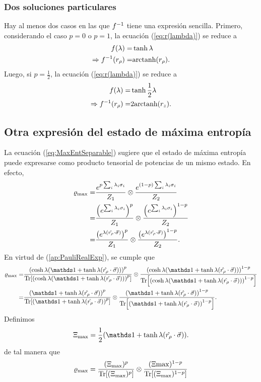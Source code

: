 \subsubsection{Dos soluciones particulares}

Hay al menos dos casos en las que $f^{-1}$ tiene una expresión sencilla. Primero, considerando el caso $p=0$ o $p=1$, la ecuación (\ref{eq:r(lambda)}) se reduce a 
\begin{align*}
f(\lambda)=&\tanh{\lambda}\\
\Rightarrow f^{-1}(r_{\rho})=&\text{arctanh}(r_{\rho}).
\end{align*}
Luego, si $p=\frac{1}{2}$, la ecuación (\ref{eq:r(lambda)}) se reduce a
\begin{align*}
    f(\lambda)=&\tanh{\frac{1}{2}\lambda}\\
    \Rightarrow f^{-1}(r_{\rho})=&2\text{arctanh}(r_{z}).
\end{align*}

\subsection{Otra expresión del estado de máxima entropía}

La ecuación (\ref{eq:MaxEntSeparable}) sugiere que el estado de máxima entropía puede expresarse como producto tensorial de potencias de un mismo estado. En efecto,
\begin{align*}
  \varrho_{\max}=&\frac{e^{p\sum_{i}\lambda_{i}\sigma_{i}}}{Z_{1}} \otimes \frac{e^{(1-p)\sum_{i}\lambda_{i}\sigma_{i}}}{Z_{2}}\\
  =&\frac{\qty(e^{\sum_{i}\lambda_{i}\sigma_{i}})^{p} }{Z_{1}}\otimes \frac{\qty(e^{\sum_{i}\lambda_{i}\sigma_{i}})^{1-p}}{Z_{2}}\\
  =&\frac{\qty(e^{\lambda(\hat{r_{\rho}}\cdot\vec{\sigma})})^{p}}{Z_{1}} \otimes \frac{\qty(e^{\lambda(\hat{r_{\rho}}\cdot\vec{\sigma})})^{1-p}}{Z_{2}}.
\end{align*}
En virtud de (\ref*{ap:PauliRealExp}), se cumple que
\begin{align*}
  \varrho_{\max}=&\frac{\qty(\cosh{\lambda}(\Id+\tanh{\lambda}(\paulivec{r_{\rho}})))^{p}}{\Tr[\qty(\cosh{\lambda}(\Id+\tanh{\lambda}(\paulivec{r_{\rho}})))^{p}]} \otimes \frac{\qty(\cosh{\lambda}(\Id+\tanh{\lambda}(\paulivec{r_{\rho}})))^{1-p}}{\Tr[\qty(\cosh{\lambda}(\Id+\tanh{\lambda}(\paulivec{r_{\rho}})))^{1-p}]}\\
  =&\frac{\qty(\Id+\tanh{\lambda}(\paulivec{r_{\rho}}))^{p}}{\Tr[\qty(\Id+\tanh{\lambda}(\paulivec{r_{\rho}}))^{p}]} \otimes \frac{\qty(\Id+\tanh{\lambda}(\paulivec{r_{\rho}}))^{1-p}}{\Tr[\qty(\Id+\tanh{\lambda}(\paulivec{r_{\rho}}))^{1-p}]}.
\end{align*}
Definimos
\begin{equation}\label{eq:Xi}
  \Xi_{\max}=\frac{1}{2}(\Id+\tanh{\lambda}(\paulivec{r_{\rho}})).
\end{equation}
de tal manera que 
\begin{equation}\label{eq:MaxEntSeparablePower}
  \varrho_{\max}=\frac{(\Xi_{\max})^{p}}{\Tr[ (\Xi_{\max})^{p}]}\otimes\frac{(\Xi{\max})^{1-p}}{\Tr[(\Xi_{\max})^{1-p}]}
\end{equation}


